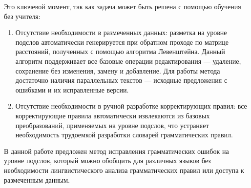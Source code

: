 Это ключевой момент, так как задача может быть решена с помощью обучения без учителя:
\begin{enumerate}
    \item Отсутствие необходимости в размеченных данных: разметка на уровне подслов автоматически генерируется при обратном проходе по матрице расстояний, полученных с помощью алгоритма Левенштейна. Данный алгоритм поддерживает все базовые операции редактирования --- удаление, сохранение без изменения, замену и добавление. Для работы метода достаточно наличия параллельных текстов --- исходные предложения с ошибками и их исправленные версии.
    \item Отсутствие необходимости в ручной разработке корректирующих правил: все корректирующие правила автоматически извлекаются из базовых преобразований, применяемых на уровне подслов, что устраняет необходимость трудоемкой разработки словарей грамматических правил.
\end{enumerate}

В данной работе предложен метод исправления грамматических ошибок на уровне подслов, который можно обобщить для различных языков без необходимости лингвистического анализа грамматических правил или доступа к размеченным данным.



